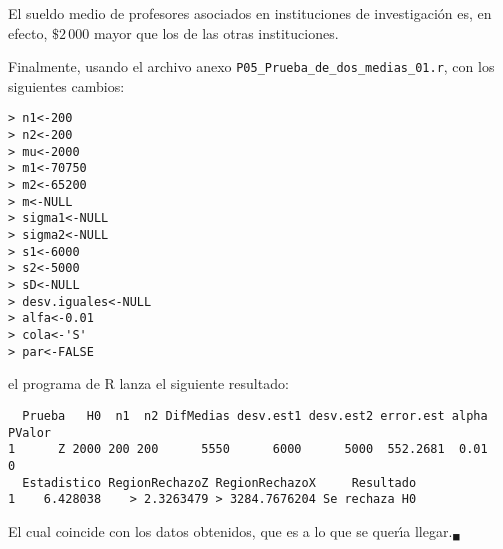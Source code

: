 \begin{solucion}
 \begin{conclusion}
  El sueldo medio de profesores asociados en instituciones de investigaci\'on es, en efecto, $\$2\,000$ mayor que los de las otras instituciones.
 \end{conclusion}

 Finalmente, usando el archivo anexo
 \texttt{P05\_Prueba\_de\_dos\_medias\_01.r},
 con los siguientes cambios:
 \begin{verbatim}
> n1<-200
> n2<-200
> mu<-2000
> m1<-70750
> m2<-65200
> m<-NULL
> sigma1<-NULL
> sigma2<-NULL
> s1<-6000
> s2<-5000
> sD<-NULL
> desv.iguales<-NULL
> alfa<-0.01
> cola<-'S'
> par<-FALSE
 \end{verbatim}
 \vspace{-0.5cm}
 el programa de R lanza el siguiente resultado:
 \begin{verbatim}
  Prueba   H0  n1  n2 DifMedias desv.est1 desv.est2 error.est alpha PValor
1      Z 2000 200 200      5550      6000      5000  552.2681  0.01      0
  Estadistico RegionRechazoZ RegionRechazoX     Resultado
1    6.428038    > 2.3263479 > 3284.7676204 Se rechaza H0
 \end{verbatim}
 \vspace{-0.5cm}
 El cual coincide con los datos obtenidos,
 que es a lo que se quer\'{\i}a llegar.${}_{\blacksquare}$
\end{solucion}
